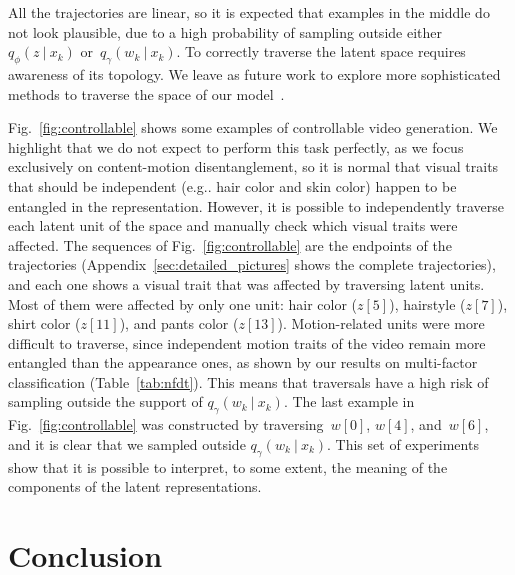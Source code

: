 \documentclass[journal]{IEEEtran}
\makeatletter
\newcommand\givenbase[1][]{\:#1\lvert\:}
\let\given\givenbase
\DeclareRobustCommand\onedot{\futurelet\@let@token\@onedot}
\def\@onedot{\ifx\@let@token.\else.\null\fi\xspace}
\def\eg{{e.g}\onedot} \def\Eg{{E.g}\onedot}
\makeatother
\begin{document}
All the trajectories are linear, so it is expected that examples in the middle do not look plausible, due to a high probability of sampling outside either~$q_\phi(z\given x_k)$ or~$q_\gamma(w_k\given x_k)$.
To correctly traverse the latent space requires awareness of its topology.
We leave as future work to explore more sophisticated methods to traverse the space of our model~\cite{Ye2019, Song2020cyb}.

Fig.~\ref{fig:controllable} shows some examples of controllable video generation.
We highlight that we do not expect to perform this task perfectly, as we focus exclusively on content-motion disentanglement, so it is normal that visual traits that should be independent (\eg hair color and skin color) happen to be entangled in the representation.
However, it is possible to independently traverse each latent unit of the space and manually check which visual traits were affected.
The sequences of Fig.~\ref{fig:controllable} are the endpoints of the trajectories (Appendix~\ref{sec:detailed_pictures} shows the complete trajectories), and each one shows a visual trait that was affected by traversing latent units.
Most of them were affected by only one unit: hair color ($z[5]$), hairstyle ($z[7]$), shirt color ($z[11]$), and pants color ($z[13]$).
Motion-related units were more difficult to traverse, since independent motion traits of the video remain more entangled than the appearance ones, as shown by our results on multi-factor classification (Table~\ref{tab:nfdt}).
This means that traversals have a high risk of sampling outside the support of $q_\gamma(w_k\given x_k)$.
The last example in Fig.~\ref{fig:controllable} was constructed by traversing~$w[0]$, $w[4]$, and~$w[6]$, and it is clear that we sampled outside $q_\gamma(w_k\given x_k)$.
This set of experiments show that it is possible to interpret, to some extent, the meaning of the components of the latent representations.

\section{Conclusion}
\label{sec:conclusions}
\end{document}
